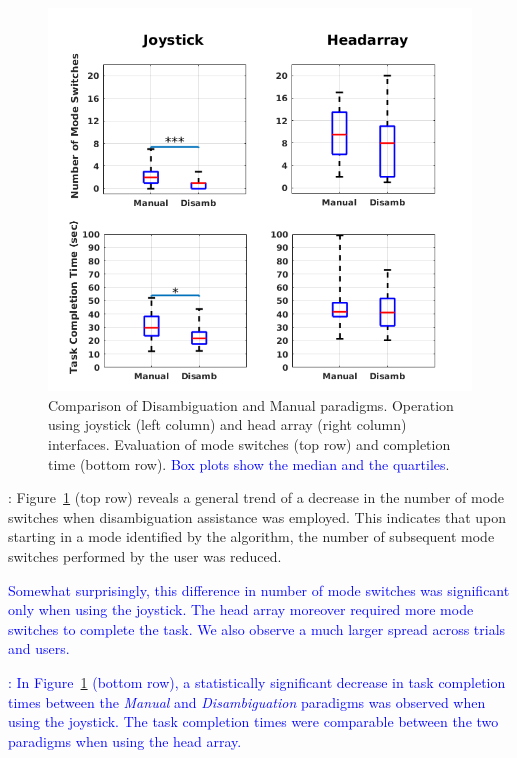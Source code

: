 \documentclass[conference]{IEEEtran}
\begin{document}
\begin{figure}[t]
	\centering
	\includegraphics[width = 1.11\hsize ,center]{./figures/FINAL_BOXPLOT_3.png}
	\vspace{-0.7cm}
	\caption{Comparison of Disambiguation and Manual paradigms. Operation using joystick (left column) and head array (right column) interfaces. Evaluation of mode switches (top row) and completion time (bottom row). \textcolor{blue}{Box plots show the median and the quartiles}.}
	\label{DATAPLOT}
\end{figure}
\vspace{0.1cm}
: Figure~\ref{DATAPLOT} (top row) reveals a general trend of a decrease in the number of mode switches when disambiguation assistance was employed. This indicates that upon starting in a mode identified by the algorithm, the number of subsequent mode switches performed by the user was reduced.
 
\textcolor{blue}{Somewhat surprisingly, this difference in number of mode switches was significant only when using the joystick. The head array moreover required more mode switches to complete the task. We also observe a much larger spread across trials and users.}

\vspace{0.1cm}
\textcolor{blue}{: 
In Figure~\ref{DATAPLOT} (bottom row), a statistically significant decrease in task completion times between the \textit{Manual} and \textit{Disambiguation} paradigms was observed when using the joystick. The task completion times were comparable between the two paradigms when using the head array. }
\end{document}
